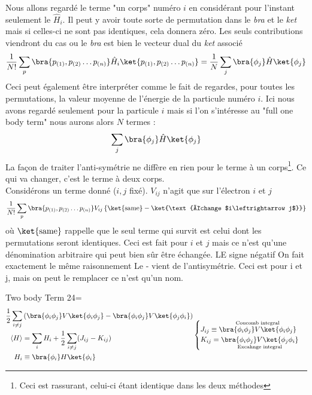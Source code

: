 Nous allons regardé le terme "un corps" numéro $i$ en considérant pour l'instant seulement le $\hat{H}_i$. Il peut y 
avoir toute sorte de permutation dans le \textit{bra} et le \textit{ket} mais si celles-ci ne sont pas identiques, 
cela donnera zéro. Les seuls contributions viendront du cas ou le \textit{bra} est bien le vecteur dual du 
\textit{ket} associé
\begin{equation}
\frac{1}{N!}\sum_p \bra{p_{(1)},p_{(2)}\dots p_{(n)}}\hat{H}_i\ket{p_{(1)},p_{(2)}\dots p_{(n)}} = \frac{1}{N}
\sum_j\bra{\phi_j}\hat{H}\ket{\phi_j}
\end{equation}
Ceci peut également être interpréter comme le fait de regardes, pour toutes les permutations, la valeur moyenne 
de l'énergie de la particule numéro $i$. Ici nous avons regardé seulement pour la particule $i$ mais si l'on 
s'intéresse au "full one body term" nous aurons alors $N$ termes :
\begin{equation}
\sum_j\bra{\phi_j}\hat{H}\ket{\phi_j}
\end{equation}
La façon de traiter l'anti-symétrie ne diffère en rien pour le terme à un corps\footnote{Ceci est rassurant, 
celui-ci étant identique dans les deux méthodes}. Ce qui va changer, c'est le terme à deux corps.\\

Considérons un terme donné ($i,j$ fixé). $V_{ij}$ n'agit que sur l'électron $i$ et $j$
\begin{equation}
\frac{1}{N!}\sum_p \bra{p_{(1)},p_{(2)}\dots p_{(n)}} V_{ij} \left\{\ket{\text{same}} - \ket{\text{échange $i\leftrightarrow j$}}\right\}
\end{equation}
où $\ket{\text{same}}$ rappelle que le seul terme qui survit est celui dont les permutations seront identiques. Ceci 
est fait pour $i$ et $j$ mais ce n'est qu'une dénomination arbitraire qui peut bien sûr être échangée. LE signe 
négatif
On fait exactement le même raisonnement Le - vient de l'antisymétrie. Ceci est pour i et j, mais on peut le remplacer ce 
n'est qu'un nom. 

Two body Term
24=
\begin{equation}
\begin{split}
\frac{1}{2}\sum_{i\neq j} &\left(\bra{\phi_i\phi_j}V\ket{\phi_i\phi_j}-\bra{\phi_i\phi_j}V\ket{\phi_j\phi_i}\right)\\
\left\langle H\right\rangle &= \sum_i H_i + \frac{1}{2} \sum_{i\neq j} (J_{ij}-K_{ij})\\
H_i &\equiv \bra{\phi_i}H\ket{\phi_i}
\end{split}
\begin{cases}
J_{ij} \equiv \overset{\text{Coucomb integral}}{\bra{\phi_i\phi_j}V\ket{\phi_i\phi_j}}\\
K_{ij} = \underset{\text{Excahnge integral}}{\bra{\phi_i\phi_j}V\ket{\phi_j\phi_i}}
\end{cases}
\end{equation}

